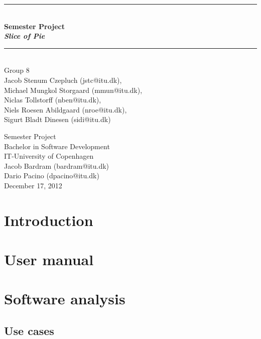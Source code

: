 \documentclass[a4paper,11pt]{article}
\begin{document}
\begin{titlepage}
\centering \parindent=0pt
\newcommand{\HRule}{\rule{\textwidth}{1mm}}
 \HRule\\[1cm]\Huge\bfseries
Semester Project\\\emph{Slice of Pie}\\[0.7cm]
\HRule\\[4cm]  \large Group 8
\\Jacob Stenum Czepluch (jstc@itu.dk), 
\\Michael Mungkol Storgaard (mmun@itu.dk),
\\Niclas Tollstorff (nben@itu.dk), 
\\Niels Roesen Abildgaard (nroe@itu.dk), 
\\Sigurt Bladt Dinesen (sidi@itu.dk) \\

 \normalsize %
\thispagestyle{empty}
\begin{flushleft}
Semester Project\\
Bachelor in Software Development\\
IT-University of Copenhagen\\
Jacob Bardram (bardram@itu.dk)\\
Dario Pacino (dpacino@itu.dk) \\
December 17, 2012 \end{flushleft}
\end{titlepage}

\tableofcontents
\pagebreak

\pagebreak
\setcounter{page}{4}
\section{Introduction}


\pagebreak
\section{User manual}

\pagebreak
\section{Software analysis}


\subsection{Use cases}

\end{document}
